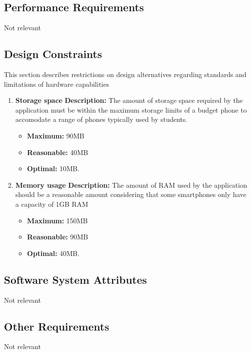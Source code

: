 \documentclass{article}
\begin{document}
	
	\subsection{Performance Requirements}
	Not relevant
	
	\subsection{Design Constraints}
	This section describes restrictions on design alternatives regarding standards and limitations of hardware capabilities
	\begin{enumerate}
		\item \textbf{Storage space}\newline
			 \textbf{Description:} The amount of storage space required by the application must be within the maximum storage limits of a budget phone to accomodate a range of phones typically used by students.
			\begin{itemize}
			\item \textbf{Maximum:} 90MB
			\item \textbf{Reasonable:} 40MB
			\item \textbf{Optimal:} 10MB.\newline
		\end{itemize}
	
		\item \textbf{Memory usage}\newline
			\textbf{Description:} The amount of RAM used by the application should be a reasonable amount considering that some smartphones only have a capacity of 1GB RAM
			\begin{itemize}
			\item \textbf{Maximum:} 150MB
			\item \textbf{Reasonable:} 90MB
			\item \textbf{Optimal:} 40MB.\newline
		\end{itemize}
	\end{enumerate}
	
	\subsection{Software System Attributes}
	Not relevant
	\subsection{Other Requirements}
	Not relevant
\end{document}
